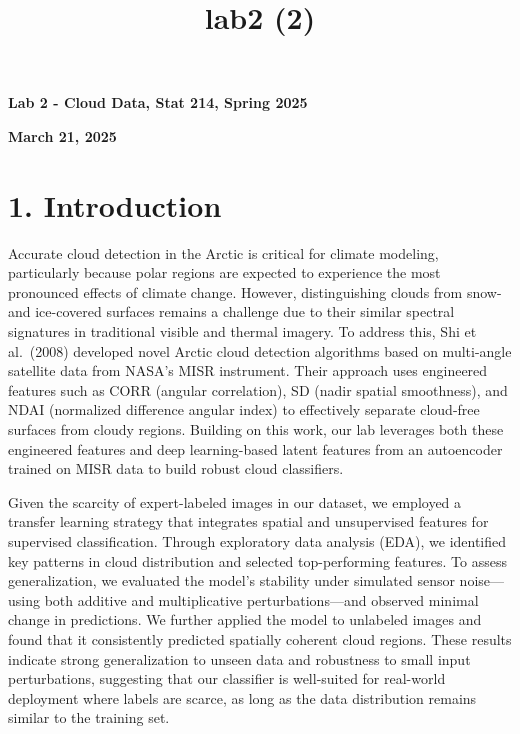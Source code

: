 \documentclass[11pt]{article}
\title{lab2 (2)}
\begin{document}
    
    
    

    
\begin{center}
    \Large\textbf{Lab 2 - Cloud Data, Stat 214, Spring 2025}
\end{center}


\begin{center}
\textbf{March 21, 2025}
\end{center}

\section*{1. Introduction}\label{introduction}

Accurate cloud detection in the Arctic is critical for climate modeling,
particularly because polar regions are expected to experience the most
pronounced effects of climate change. However, distinguishing clouds
from snow- and ice-covered surfaces remains a challenge due to their
similar spectral signatures in traditional visible and thermal imagery.
To address this, Shi et al.~(2008) developed novel Arctic cloud
detection algorithms based on multi-angle satellite data from NASA's
MISR instrument. Their approach uses engineered features such as CORR
(angular correlation), SD (nadir spatial smoothness), and NDAI
(normalized difference angular index) to effectively separate cloud-free
surfaces from cloudy regions. Building on this work, our lab leverages
both these engineered features and deep learning-based latent features
from an autoencoder trained on MISR data to build robust cloud
classifiers.

Given the scarcity of expert-labeled images in our dataset, we employed
a transfer learning strategy that integrates spatial and unsupervised
features for supervised classification. Through exploratory data
analysis (EDA), we identified key patterns in cloud distribution and
selected top-performing features. To assess generalization, we evaluated
the model's stability under simulated sensor noise---using both additive
and multiplicative perturbations---and observed minimal change in
predictions. We further applied the model to unlabeled images and found
that it consistently predicted spatially coherent cloud regions. These
results indicate strong generalization to unseen data and robustness to
small input perturbations, suggesting that our classifier is well-suited
for real-world deployment where labels are scarce, as long as the data
distribution remains similar to the training set.
\end{document}
